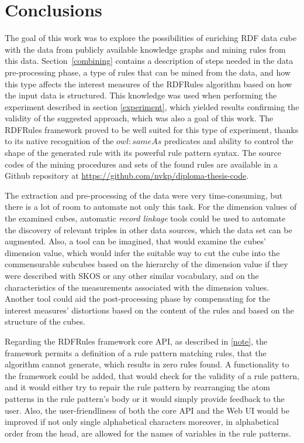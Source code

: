 \chapter*{Conclusions}

The goal of this work was to explore the possibilities of enriching RDF data cube with the data from publicly available knowledge graphs and mining rules from this data. Section~\ref{combining} contains a description of steps needed in the data pre-processing phase, a type of rules that can be mined from the data, and how this type affects the interest measures of the RDFRules algorithm based on how the input data is structured. This knowledge was used when performing the experiment described in section \ref{experiment}, which yielded results confirming the validity of the suggested approach, which was also a goal of this work. The RDFRules framework proved to be well suited for this type of experiment, thanks to its native recognition of the $owl:sameAs$ predicates and ability to control the shape of the generated rule with its powerful rule pattern syntax. The source codes of the mining procedures and sets of the found rules are available in a Github repository at \href{https://github.com/nvkp/diploma-thesis-code}{https://github.com/nvkp/diploma-thesis-code}.

The extraction and pre-processing of the data were very time-consuming, but there is a lot of room to automate not only this task. For the dimension values of the examined cubes, automatic \textit{record linkage} \cite{Sheth2013} tools could be used to automate the discovery of relevant triples in other data sources, which the data set can be augmented. Also, a tool can be imagined, that would examine the cubes' dimension value, which would infer the suitable way to cut the cube into the commensurable subcubes based on the hierarchy of the dimension value if they were described with SKOS or any other similar vocabulary, and on the characteristics of the measurements associated with the dimension values. Another tool could aid the post-processing phase by compensating for the interest measures' distortions based on the content of the rules and based on the structure of the cubes. 

Regarding the RDFRules framework core API, as described in \ref{note}, the framework permits a definition of a rule pattern matching rules, that the algorithm cannot generate, which results in zero rules found. A functionality to the framework could be added, that would check for the validity of a rule pattern, and it would either try to repair the rule pattern by rearranging the atom patterns in the rule pattern's body or it would simply provide feedback to the user. Also, the user-friendliness of both the core API and the Web UI would be improved if not only single alphabetical characters moreover, in alphabetical order from the head, are allowed for the names of variables in the rule patterns.
